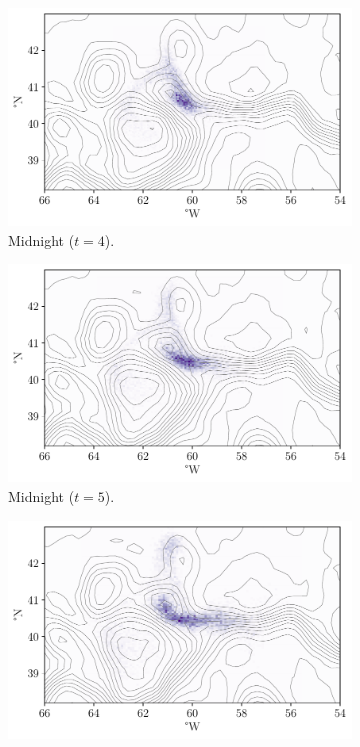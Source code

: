 \begin{figure}
	\begin{subfigure}{0.49\textwidth}
		\includegraphics[width=\textwidth]{chp06_applications/figures/gulf_stream/rels_ssh_4.0}
		\caption{Midnight  (\(t = 4\)).}
		\label{fig:na_hist_t3_3}
	\end{subfigure}
	\begin{subfigure}{0.49\textwidth}
		\includegraphics[width=\textwidth]{chp06_applications/figures/gulf_stream/rels_ssh_5.0}
		\caption{Midnight  (\(t = 5\)).}
		\label{fig:na_hist_t3_4}
	\end{subfigure}
	\begin{subfigure}{0.49\textwidth}
		\includegraphics[width=\textwidth]{chp06_applications/figures/gulf_stream/rels_ssh_6.0}

\end{subfigure}
\end{figure}
